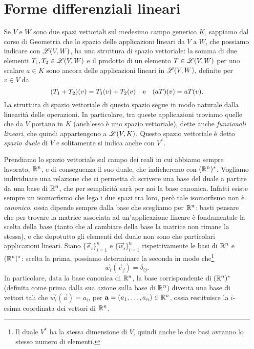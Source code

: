 \section{Forme differenziali lineari}
Se $V$ e $W$ sono due spazi vettoriali sul medesimo campo generico $K$, sappiamo dal corso di Geometria che lo spazio delle applicazioni lineari da $V$ a $W$, che possiamo indicare con $\mathscr L(V,W)$, ha una struttura di spazio vettoriale: la somma di due elementi $T_1,T_2\in\mathscr L(V,W)$ e il prodotto di un elemento $T\in\mathscr L(V,W)$ per uno scalare $a\in K$ sono ancora delle applicazioni lineari in $\mathscr L(V,W)$, definite per $v\in V$ da
\begin{equation*}
	(T_1+T_2)(v)=T_1(v)+T_2(v)\quad\text{e}\quad (aT)(v)=aT(v).
\end{equation*}
La struttura di spazio vettoriale di questo spazio segue in modo naturale dalla linearità delle operazioni.
In particolare, tra queste applicazioni troviamo quelle che da $V$ portano in $K$ (anch'esso è uno spazio vettoriale), dette anche \emph{funzionali lineari}, che quindi appartengono a $\mathscr L(V,K)$.
Questo spazio vettoriale è detto \emph{spazio duale} di $V$ e solitamente si indica anche con $V^*$.

Prendiamo lo spazio vettoriale sul campo dei reali in cui abbiamo sempre lavorato, $\mathbb{R}^n$, e di conseguenza il suo duale, che indicheremo con $(\mathbb{R}^n)^*$.
Vogliamo individuare una relazione che ci permetta di scrivere una base del duale a partire da una base di $\mathbb{R}^n$, che per semplicità sarà per noi la base canonica.
Infatti esiste sempre un isomorfismo che lega i due spazi tra loro, però tale isomorfismo non è \emph{canonico}, ossia dipende sempre dalla base che scegliamo per $\mathbb{R}^n$: basti pensare che per trovare la matrice associata ad un'applicazione lineare è fondamentale la scelta della base (tanto che al cambiare della base la matrice non rimane la stessa), e che dopotutto gli elementi del duale non sono che particolari applicazioni lineari.
Siano $\{\vec e_i\}_{i=1}^n$ e $\{\vec w_i\}_{i=1}^n$ rispettivamente le basi di $\mathbb{R}^n$ e $(\mathbb{R}^n)^*$: scelta la prima, possiamo determinare la seconda in modo che\footnote{Il duale $V^*$ ha la stessa dimensione di $V$, quindi anche le due basi avranno lo stesso numero di elementi.}
\begin{equation}
	\vec w_i(\vec e_j)=\delta_{ij}.
	\label{eq:funzionale-base-canonica}
\end{equation}
In particolare, data la base canonica di $\mathbb{R}^n$, la base corrispondente di $(\mathbb{R}^n)^*$ (definita come prima dalla sua azione sulla base di $\mathbb{R}^n$) diventa una base di vettori tali che $\vec w_i(\vec a)=a_i$, per $\mathbf{a}=(a_1,\dots,a_n)\in\mathbb{R}^n$, ossia restituisce la $i$-esima coordinata dei vettori di $\mathbb{R}^n$.


